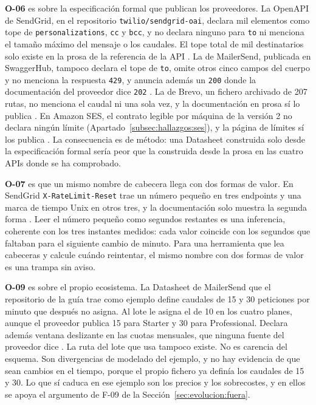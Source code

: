 \textbf{O-06} es sobre la especificación formal que publican los proveedores. La
OpenAPI de SendGrid, en el repositorio \texttt{twilio/sendgrid-oai}, declara mil
elementos como tope de \texttt{personalizations}, \texttt{cc} y \texttt{bcc}, y no
declara ninguno para \texttt{to} ni menciona el tamaño máximo del mensaje o los
caudales. El tope total de mil destinatarios solo existe en la prosa de la
referencia de la API \citep{sendgriddocs}. La de MailerSend, publicada en
SwaggerHub, tampoco declara el tope de \texttt{to}, omite otros cinco campos del
cuerpo y no menciona la respuesta \texttt{429}, y anuncia además un \texttt{200}
donde la documentación del proveedor dice \texttt{202} \citep{mailersenddocs}.
La de Brevo, un fichero archivado de 207 rutas, no menciona el caudal ni una sola vez, y la documentación en prosa sí lo publica \citep{brevodocs}.
En Amazon SES, el contrato legible por máquina de la versión 2 no declara ningún límite (Apartado~\ref{subsec:hallazgos:ses}), y la página de límites sí los publica \citep{sesdocs}.
La consecuencia es de método: una Datasheet construida solo desde la especificación formal sería peor que la construida desde la prosa en las cuatro APIs donde se ha comprobado.

\textbf{O-07} es que un mismo nombre de cabecera llega con dos formas de valor. En
SendGrid \texttt{X-RateLimit-Reset} trae un número pequeño en tres endpoints y una
marca de tiempo Unix en otros tres, y la documentación solo muestra la segunda forma
\citep{sendgridratelimits}. Leer el número pequeño como segundos restantes es una
inferencia, coherente con los tres instantes medidos: cada valor coincide con los
segundos que faltaban para el siguiente cambio de minuto. Para una herramienta que
lea cabeceras y calcule cuándo reintentar, el mismo nombre con dos formas de valor es
una trampa sin aviso.

\textbf{O-09} es sobre el propio ecosistema. La Datasheet de MailerSend que el
repositorio de la guía trae como ejemplo define caudales de 15 y 30 peticiones por
minuto que después no asigna. Al lote le asigna el de 10 en los cuatro planes, aunque
el proveedor publica 15 para Starter y 30 para Professional. Declara además ventana
deslizante en las cuotas mensuales, que ninguna fuente del proveedor dice
\citep{apisconsumptionmodel}. La ruta del lote que usa tampoco
existe. No es carencia del esquema.
Son divergencias de modelado del ejemplo, y no hay evidencia de que sean cambios en el tiempo, porque el propio fichero ya definía los caudales de 15 y 30.
Lo que sí caduca en ese ejemplo son los precios y los sobrecostes, y en ellos se apoya el argumento de F-09 de la Sección~\ref{sec:evolucion:fuera}.

